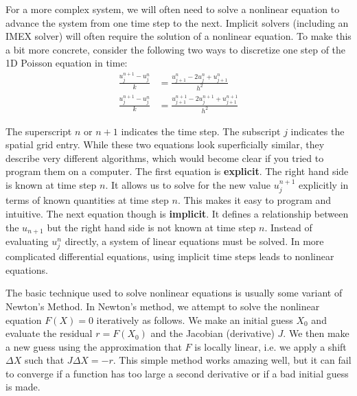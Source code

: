 \documentclass[11pt]{article} %
\begin{document}
For a more complex system, we will often need to solve a nonlinear equation
to advance the system from one time step to the next.
Implicit solvers (including an IMEX solver) will often require the solution of a nonlinear equation.
To make this a bit more concrete, consider the following two ways to discretize one
step of the 1D Poisson equation in time:
\begin{align}
\frac{u^{n+1}_{j} - u^{n}_{j}}{k} &= \frac{u^{n}_{j+1} - 2u^{n}_{j} + u^{n}_{j+1} }{h^2} \\
\frac{u^{n+1}_{j} - u^{n}_{j}}{k} &= \frac{u^{n+1}_{j+1} - 2u^{n+1}_{j} + u^{n+1}_{j+1} }{h^2}
\end{align}

The superscript $n$ or $n+1$ indicates the time step.  
The subscript $j$ indicates the spatial grid entry.
While these two equations look superficially similar, they describe very different algorithms, 
which would become clear if you tried to program them on a computer.
The first equation is \textbf{explicit}.  The right hand side is known at time step $n$.
It allows us to solve for the new value $u^{n+1}_{j}$ explicitly in terms of known quantities at time step $n$.
This makes it easy to program and intuitive.
The next equation though is \textbf{implicit}.  
It defines a relationship between the $u_{n+1}$ but the right hand side is not known at time step $n$.
Instead of evaluating $u^{n}_{j}$ directly, a system of linear equations must be solved.
In more complicated differential equations, using implicit time steps leads to nonlinear equations.

The basic technique used to solve nonlinear equations is usually some variant of Newton's Method.
In Newton's method, we attempt to solve the nonlinear equation $F(X) = 0$ iteratively as follows.
We make an initial guess $X_0$ and evaluate the residual $r = F(X_0)$ and the Jacobian (derivative) $J$.
We then make a new guess using the approximation that $F$ is locally linear,
i.e. we apply a shift $\Delta X$ such that $J \Delta X = -r$.
This simple method works amazing well, but it can fail to converge if a function
has too large a second derivative or if a bad initial guess is made.
\end{document}
